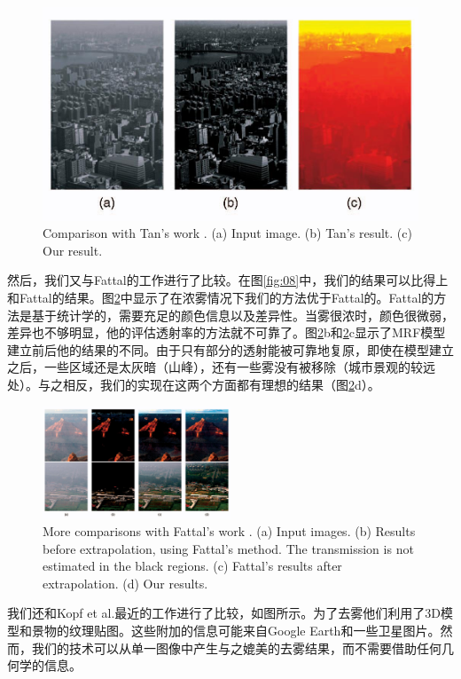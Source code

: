 \documentclass{ctexart}
\begin{document}
\begin{figure}[tbp]
	\centering
	\includegraphics[width=\textwidth]{img/14.jpg}
	\caption{Comparison with Tan’s work \cite{Tan2008}. (a) Input image. (b) Tan’s result. (c) Our result.}\label{fig:14}
\end{figure}

然后，我们又与Fattal的工作进行了比较。在图\ref{fig:08}中，我们的结果可以比得上和Fattal的结果。图\ref{fig:15}中显示了在浓雾情况下我们的方法优于Fattal的。Fattal的方法是基于统计学的，需要充足的颜色信息以及差异性。当雾很浓时，颜色很微弱，差异也不够明显，他的评估透射率的方法就不可靠了。图\ref{fig:15}b和\ref{fig:15}c显示了MRF模型建立前后他的结果的不同。由于只有部分的透射能被可靠地复原，即使在模型建立之后，一些区域还是太灰暗（山峰），还有一些雾没有被移除（城市景观的较远处）。与之相反，我们的实现在这两个方面都有理想的结果（图\ref{fig:15}d）。\par

\begin{figure}[tbp]
	\centering
	\includegraphics[width=0.5\textwidth]{img/15.jpg}
	\caption{More comparisons with Fattal’s work \cite{Fattal2008}. (a) Input images. (b) Results before extrapolation, using Fattal’s method. The transmission is not estimated in the black regions. (c) Fattal’s results after extrapolation. (d) Our results.}\label{fig:15}
\end{figure}

我们还和Kopf et al.\cite{KopfNeubertChenCohenCohenOrDeussenUyttendaeleLischinski2008}最近的工作进行了比较，如图所示。为了去雾他们利用了3D模型和景物的纹理贴图。这些附加的信息可能来自Google Earth和一些卫星图片。然而，我们的技术可以从单一图像中产生与之媲美的去雾结果，而不需要借助任何几何学的信息。\par
\end{document}
